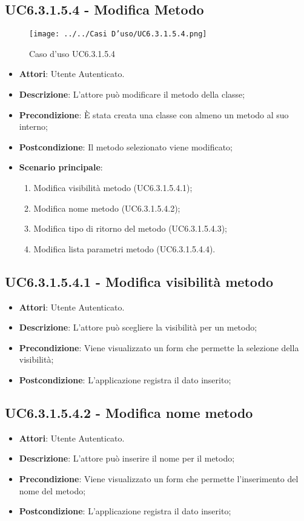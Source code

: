 \subsection{UC6.3.1.5.4 - Modifica Metodo} 
\label{ssec:UC6.3.1.5.4} 
\begin{figure}[h!] 
\centering 
\texttt{[image: ../../Casi D'uso/UC6.3.1.5.4.png]} 
\caption{Caso d'uso UC6.3.1.5.4} 
 \end{figure} 
\begin{itemize} 
\item \textbf{Attori}: Utente Autenticato.
\item \textbf{Descrizione}: L'attore può modificare il metodo della classe;
\item \textbf{Precondizione}: È stata creata una classe con almeno un metodo al suo interno;
\item \textbf{Postcondizione}: Il metodo selezionato viene modificato;
\item \textbf{Scenario principale}: \begin{enumerate}\item Modifica visibilità metodo (UC6.3.1.5.4.1);\item Modifica nome metodo (UC6.3.1.5.4.2);\item Modifica tipo di ritorno del metodo (UC6.3.1.5.4.3);\item Modifica lista parametri metodo (UC6.3.1.5.4.4). 
 \end{enumerate}
\end{itemize} 
\subsection{UC6.3.1.5.4.1 - Modifica visibilità metodo} 
\label{ssec:UC6.3.1.5.4.1} 
\begin{itemize} 
\item \textbf{Attori}: Utente Autenticato.
\item \textbf{Descrizione}: L'attore può scegliere la visibilità per un metodo;
\item \textbf{Precondizione}: Viene visualizzato un form che permette la selezione della visibilità;
\item \textbf{Postcondizione}: L'applicazione registra il dato inserito;
\end{itemize} 
\subsection{UC6.3.1.5.4.2 - Modifica nome metodo} 
\label{ssec:UC6.3.1.5.4.2} 
\begin{itemize} 
\item \textbf{Attori}: Utente Autenticato.
\item \textbf{Descrizione}: L'attore può inserire il nome per il metodo;
\item \textbf{Precondizione}: Viene visualizzato un form che permette l'inserimento del nome del metodo;
\item \textbf{Postcondizione}: L'applicazione registra il dato inserito;
\end{itemize} 
